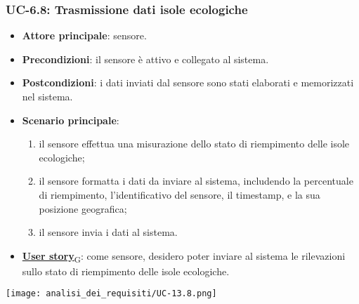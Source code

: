 \subsubsection{UC-6.8: Trasmissione dati isole ecologiche}
\begin{itemize}
	\item \textbf{Attore principale}: sensore.
	\item \textbf{Precondizioni}: il sensore è attivo e collegato al sistema.
	\item \textbf{Postcondizioni}: i dati inviati dal sensore sono stati elaborati e memorizzati nel sistema.
	\item \textbf{Scenario principale}:
	      \begin{enumerate}
		      \item il sensore effettua una misurazione dello stato di riempimento delle isole ecologiche;
		      \item il sensore formatta i dati da inviare al sistema, includendo la percentuale di riempimento, l'identificativo del sensore,
		            il timestamp, e la sua posizione geografica;
		      \item il sensore invia i dati al sistema.
	      \end{enumerate}
	\item \href{https://7last.github.io/docs/pb/documentazione-interna/glossario\#user-story}{\textbf{User story}\textsubscript{G}}: come sensore, desidero poter inviare al sistema le rilevazioni sullo stato di riempimento delle isole ecologiche.
\end{itemize}

\begin{center}
	\texttt{[image: analisi\_dei\_requisiti/UC-13.8.png]}
\end{center}

